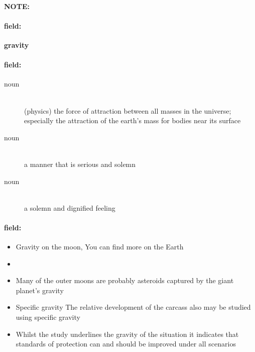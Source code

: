 \documentclass[12pt]{article}
\newenvironment{note}{\paragraph{NOTE:}}{}
\newenvironment{field}{\paragraph{field:}}{}
\begin{document}
\begin{note}
\begin{field}
\textbf{\large gravity}
\end{field}


\begin{field}
\begin{description}
\item[noun] \hfill \\ 
(physics) the force of attraction between all masses in the universe; especially the attraction of the earth's mass for bodies near its surface

\item[noun] \hfill \\ 
a manner that is serious and solemn

\item[noun] \hfill \\ 
a solemn and dignified feeling

\end{description}
\end{field}

\begin{field}
\begin{itemize}
\item Gravity on the moon, You can find more on the Earth
\item 
\item Many of the outer moons are probably asteroids captured by the giant planet's gravity
\item Specific gravity The relative development of the carcass also may be studied using specific gravity
\item Whilst the study underlines the gravity of the situation it indicates that standards of protection can and should be improved under all scenarios
\end{itemize}
\end{field}
\end{note}
\end{document}
